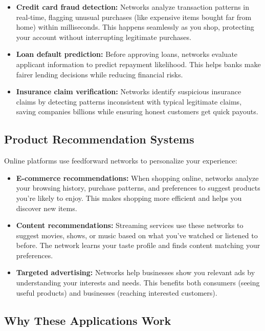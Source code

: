 \begin{itemize}
    \item \textbf{Credit card fraud detection:} Networks analyze transaction patterns in real-time, flagging unusual purchases (like expensive items bought far from home) within milliseconds. This happens seamlessly as you shop, protecting your account without interrupting legitimate purchases.
    
    \item \textbf{Loan default prediction:} Before approving loans, networks evaluate applicant information to predict repayment likelihood. This helps banks make fairer lending decisions while reducing financial risks.
    
    \item \textbf{Insurance claim verification:} Networks identify suspicious insurance claims by detecting patterns inconsistent with typical legitimate claims, saving companies billions while ensuring honest customers get quick payouts.
\end{itemize}

\subsection{Product Recommendation Systems}

Online platforms use feedforward networks to personalize your experience:

\begin{itemize}
    \item \textbf{E-commerce recommendations:} When shopping online, networks analyze your browsing history, purchase patterns, and preferences to suggest products you're likely to enjoy. This makes shopping more efficient and helps you discover new items.
    
    \item \textbf{Content recommendations:} Streaming services use these networks to suggest movies, shows, or music based on what you've watched or listened to before. The network learns your taste profile and finds content matching your preferences.
    
    \item \textbf{Targeted advertising:} Networks help businesses show you relevant ads by understanding your interests and needs. This benefits both consumers (seeing useful products) and businesses (reaching interested customers).
\end{itemize}

\subsection{Why These Applications Work}

